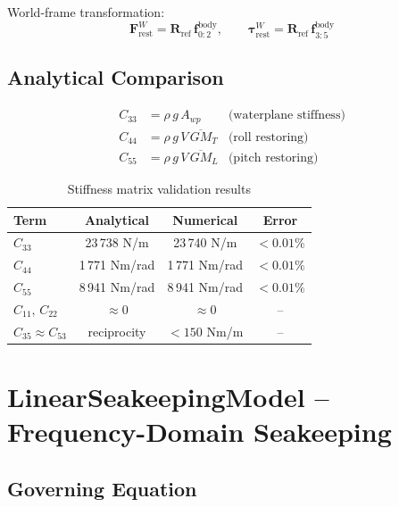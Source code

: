 \documentclass[12pt,a4paper]{article}
\newcommand{\Fvec}{\mathbf{F}}
\begin{document}
World-frame transformation:
\begin{equation}
  \Fvec_{\text{rest}}^W = \mathbf{R}_{\text{ref}}\,\mathbf{f}_{0:2}^{\text{body}},
  \qquad
  \boldsymbol{\tau}_{\text{rest}}^W = \mathbf{R}_{\text{ref}}\,\mathbf{f}_{3:5}^{\text{body}}
  \label{eq:restoring_world}
\end{equation}

\subsection{Analytical Comparison}

\begin{align}
  C_{33} &= \rho\,g\,A_{wp}
  &\text{(waterplane stiffness)} \label{eq:c33} \\
  C_{44} &= \rho\,g\,V\,\overline{GM}_T
  &\text{(roll restoring)} \label{eq:c44} \\
  C_{55} &= \rho\,g\,V\,\overline{GM}_L
  &\text{(pitch restoring)} \label{eq:c55}
\end{align}

\begin{table}[H]
  \centering
  \caption{Stiffness matrix validation results}
  \begin{tabular}{lccc}
    \toprule
    \textbf{Term} & \textbf{Analytical} & \textbf{Numerical} & \textbf{Error} \\
    \midrule
    $C_{33}$ & 23\,738 N/m & 23\,740 N/m & $<0.01\%$ \\
    $C_{44}$ & 1\,771 Nm/rad & 1\,771 Nm/rad & $<0.01\%$ \\
    $C_{55}$ & 8\,941 Nm/rad & 8\,941 Nm/rad & $<0.01\%$ \\
    $C_{11},\,C_{22}$ & $\approx 0$ & $\approx 0$ & -- \\
    $C_{35} \approx C_{53}$ & reciprocity & $<150$ Nm/m & -- \\
    \bottomrule
  \end{tabular}
\end{table}

\section{LinearSeakeepingModel -- Frequency-Domain Seakeeping}

\subsection{Governing Equation}
\end{document}
